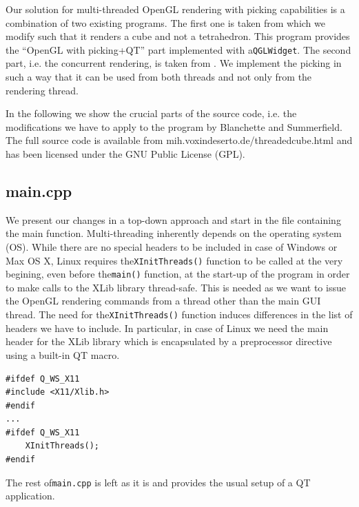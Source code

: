 \documentclass[prodmode,acmtopc]{acmsmall}
\begin{document}
Our solution for multi-threaded OpenGL rendering with picking capabilities is a combination of two existing programs.
%
The first one is taken from \cite[chapter 8]{Blanchette2008} which we modify such that it renders a cube and not a tetrahedron. This program provides the ``OpenGL with picking+QT'' part implemented with a\lstinline|QGLWidget|.
%
The second part, i.e. the concurrent rendering, is taken from \cite{glimpse3d}.
%
We implement the picking in such a way that it can be used from both threads and not only from the rendering thread.


In the following we show the crucial parts of the source code, i.e. the modifications we have to apply to the program by Blanchette and Summerfield.
%
The full source  code is available from {\sf mih.voxindeserto.de/threadedcube.html} and has been licensed under the GNU Public License (GPL).



\subsection{main.cpp}

We present our changes in a top-down approach and start in the file containing the main function.
%
Multi-threading inherently depends on the operating system (OS). 
%
While there are no special headers to be included in case of {\sf Windows} or {\sf Max OS X}, {\sf Linux} requires the\lstinline|XInitThreads()| function to be called at the very begining, even before the\lstinline|main()| function, at the start-up of the program in order to make calls to the  {\sf XLib} library thread-safe.
%
This is needed as we want to issue the OpenGL rendering commands from a thread other than the main GUI thread.
%
The need for the\lstinline|XInitThreads()| function induces differences in the list of headers we have to include.
%
In particular, in case of Linux we need the main header for the {\sf XLib} library which is encapsulated by a preprocessor directive using a built-in QT macro.
%
\begin{lstlisting}
#ifdef Q_WS_X11
#include <X11/Xlib.h>
#endif
...
#ifdef Q_WS_X11
    XInitThreads();
#endif
\end{lstlisting}
%
The rest of\lstinline|main.cpp| is left as it is and provides the usual setup of a QT application. 
\end{document}
